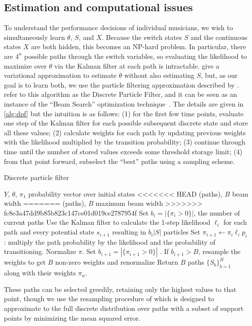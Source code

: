 \documentclass[aoas]{imsart}
\begin{document}
\subsection{Estimation and computational issues}
\label{sec:computational-issues}

To understand the performance decisions of individual musicians, we
wish to simultaneously learn $\theta$, $S$, and $X$. Because the
switch states $S$ and the continuous states $X$ are both hidden, this becomes
an NP-hard problem. In particular, there are $4^n$ possible paths
through the switch variables, so evaluating the likelihood to maximize
over $\theta$ via the Kalman filter at each path is intractable. 
\citet{GhahramaniHinton2000} give a variational approximation to
estimate $\theta$ without also estimating $S$, but, as our goal is to
learn both, we use the particle filtering approximation described by
\citet{FearnheadClifford2003}. ~\cite{WhiteleyAndrieu2010} refer to
this algorithm as the Discrete Particle Filter, and it can be seen as
an instance of the ``Beam Search'' optimization
technique~\citep{Bisiani1992}. The details are given in
\autoref{alg:dpf} but the intuition is as follows: (1) for the first
few time points, evaluate
one step of the Kalman filter for each possible subsequent discrete
state and store all these values; (2) calculate weights for each path
by updating previous weights with the likelihood multiplied by the transition probability;
(3) continue through time until the number of stored values exceeds
some threshold storage limit; (4) from that point forward, subselect
the ``best'' paths using a sampling scheme.
\begin{algorithm}[t!]
  \caption{Discrete particle filter\label{alg:dpf}}
  \begin{algorithmic}[1]
  $Y$, $\theta$, $\pi_1$ probability vector over initial states
<<<<<<< HEAD
  (paths), $B$ beam width
=======
  (paths), $B$ maximum beam width
>>>>>>> fc8e3a47dd9b85b823c147ce01d019ce2787954f
  \STATE Set $b_i=|\{\pi_i>0\}|$, the number of current paths
  \STATE Use %
  the Kalman filter to calculate the 1-step likelihood
  $\ell_i$ for each path and every potential state $s_{i+1}$ resulting in $b_i|S|$ particles
  \STATE Set $\pi_{i+1} \leftarrow \pi_i\ell_i p_i$: multiply the path
  probability by the likelihood and the probability of
  transitioning. Normalize $\pi$.
  \STATE Set $b_{i+1}=|\{\pi_{i+1}>0\}|$ . If $b_{i+1} > B$, resample the
  weights to get $B$ non-zero weights and renormalize
  \ENDFOR
  \STATE Return $B$ paths $\{S_b\}_{b=1}^B$ along with their weights $\pi_{n}$.
\end{algorithmic}
\end{algorithm}
These paths can be
selected greedily, retaining only the highest values to that point,
though we use the resampling procedure of
\citep{FearnheadClifford2003} which is designed to 
approximate to the full discrete distribution over paths with a subset
of support points by minimizing the mean squared
error.
\end{document}
